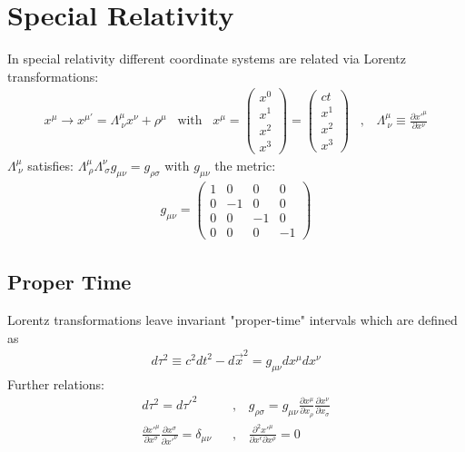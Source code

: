 \section{Special Relativity}

In special relativity different coordinate systems are related via
Lorentz transformations:
\begin{align*}
    x^\mu \rightarrow x^{\mu'} = \Lambda_{\ \nu}^\mu x^\nu + \rho^\mu
    \hspace{10pt} \text{with} \hspace{10pt}
    x^\mu = \begin{pmatrix}
        x^0 \\ x^1 \\ x^2 \\ x^3
    \end{pmatrix}
    = \begin{pmatrix}
        c t \\ x^1 \\ x^2 \\ x^3
    \end{pmatrix}
    \hspace{10pt} , \hspace{10pt}
    \Lambda_{\ \nu}^\mu \equiv \frac{\partial x'^\mu}{\partial x^\nu}
\end{align*}
$\Lambda_{\ \nu}^\mu$ satisfies: $\Lambda^\mu_{\ \rho} \Lambda_{ \ \sigma}^\nu g_{\mu \nu}
= g_{\rho \sigma}$ with $g_{\mu \nu}$ the metric:
\begin{align*}
    g_{\mu \nu} = \begin{pmatrix}
        1 & 0 & 0 & 0 \\
        0 & -1 & 0 & 0 \\
        0 & 0 & -1 & 0 \\
        0 & 0 & 0 & -1
    \end{pmatrix}
\end{align*}

\subsection{Proper Time}

Lorentz transformations leave invariant "proper-time" intervals which are
defined as
\begin{align*}
    d \tau^2 \equiv c^2 dt^2 - d \vec{x}^2 = g_{\mu \nu} dx^{\mu} dx^\nu
\end{align*}
Further relations:
\begin{align*}
    d \tau^2 = d \tau'^2
    \hspace{10pt} &, \hspace{10pt}
    g_{\rho \sigma} = g_{\mu \nu} \frac{\partial x^\mu}{\partial x_\rho} \frac{\partial x^\nu}{\partial x_\sigma}
    \\
    \frac{\partial x'^{\mu}}{\partial x^\sigma} \frac{\partial x^\sigma}{\partial x'^{\nu}} = \delta_{\mu \nu}
    \hspace{10pt} &, \hspace{10pt}
    \frac{\partial^2 x'^{\mu}}{\partial x^\epsilon \partial x^\rho} = 0
\end{align*}


